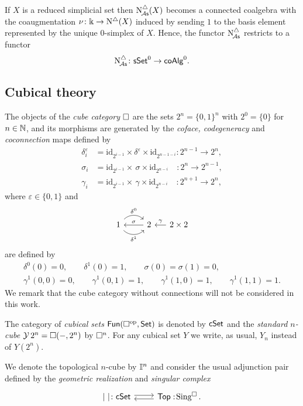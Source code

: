 If $X$ is a reduced simplicial set then $\operatorname{N^{\triangle}_{\!{\mathcal{A}\mathsf{s}}}}(X)$ becomes a connected coalgebra with the coaugmentation $\nu \colon \Bbbk \to \operatorname{N^{\triangle}}(X)$ induced by sending $1$ to the basis element represented by the unique $0$-simplex of $X$.
Hence, the functor $\operatorname{N^{\triangle}_{\!{\mathcal{A}\mathsf{s}}}}$ restricts to a functor
\[
\operatorname{N^{\triangle}_{\!{\mathcal{A}\mathsf{s}}}} \colon \mathsf{sSet}^0 \to \mathsf{coAlg}^0.
\]

\subsection{Cubical theory}\label{ss:cubical}

The objects of the \textit{cube category} $\square$ are the sets $2^n = \{0, 1\}^n$ with $2^0 = \{0\}$ for $n \in \mathbb{N}$, and its morphisms are generated by the \textit{coface, codegeneracy} and \textit{coconnection} maps defined by
\begin{align*}
	\delta_i^\varepsilon & =
	\mathrm{id}_{2^{i-1}} \times \delta^\varepsilon \times \mathrm{id}_{2^{n-1-i}} \colon 2^{n-1} \to 2^n, \\
	\sigma_i & =
	\mathrm{id}_{2^{i-1}} \times \, \sigma \times \mathrm{id}_{2^{n-i}} \quad \colon 2^{n} \to 2^{n-1}, \\
	\gamma_i & =
	\mathrm{id}_{2^{i-1}} \times \, \gamma \times \mathrm{id}_{2^{n-i}} \quad \colon 2^{n+1} \to 2^{n},
\end{align*}
where $\varepsilon \in \{0,1\}$ and
\[
\begin{tikzcd}
	1 \arrow[r, out=45, in=135, "\delta^0"] \arrow[r, out=-45, in=-135, "\delta^1"'] & 2 \arrow[l, "\sigma"'] &[-10pt] \arrow[l, "\gamma"'] 2 \times 2
\end{tikzcd}
\]
are defined by
\begin{gather*}
	\delta^0(0) = 0, \qquad
	\delta^1(0) = 1, \qquad
	\sigma(0) = \sigma(1) = 0, \qquad \\
	\gamma^1(0,0) = 0, \qquad
	\gamma^1(0,1) = 1, \qquad
	\gamma^1(1,0) = 1, \qquad
	\gamma^1(1,1) = 1.
\end{gather*}
We remark that the cube category without connections will not be considered in this work.

The category of \textit{cubical sets} $\mathsf{Fun}(\square^{\mathrm{op}}, \mathsf{Set})$ is denoted by $\mathsf{cSet}$ and
the \textit{standard $n$-cube} $\operatorname{\mathcal{Y}} 2^n = \square(-, 2^n)$ by $\square^n$.
For any cubical set $Y$ we write, as usual, $Y_n$ instead of $Y(2^n)$.

We denote the topological $n$-cube by $\mathbb{I}^{n}$ and consider the usual adjunction pair defined by the \textit{geometric realization} and \textit{singular complex}
\[
\begin{tikzcd}
	\bars{\ } \colon \cSet  \arrow[r, shift left=.5ex] &
	\Top :\! \cSing. \arrow[l, shift left=.5ex]
\end{tikzcd}
\]

